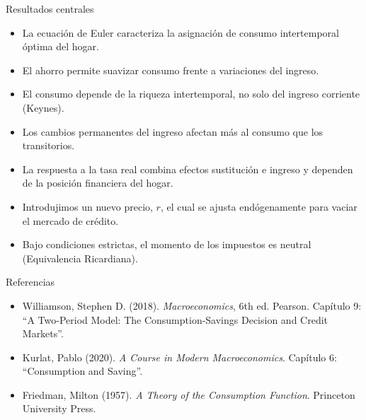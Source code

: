 \documentclass[aspectratio=169,11pt]{beamer}
\begin{document}
\begin{frame}{Resultados centrales}
  \begin{itemize}
    \setlength{\itemsep}{0.52em}
    \item La ecuación de Euler caracteriza la asignación de consumo intertemporal óptima del hogar.
    \item El ahorro permite suavizar consumo frente a variaciones del ingreso.
    \item El consumo depende de la riqueza intertemporal, no solo del ingreso corriente (Keynes).
    \item Los cambios permanentes del ingreso afectan más al consumo que los transitorios.
    \item La respuesta a la tasa real combina efectos sustitución e ingreso y dependen de la posición financiera del hogar.
    \item Introdujimos un nuevo precio, $r$, el cual se ajusta endógenamente para vaciar el mercado de crédito.
    \item Bajo condiciones estrictas, el momento de los impuestos es neutral (Equivalencia Ricardiana).
  \end{itemize}
\end{frame}

\begin{frame}{Referencias}
  \begin{itemize}
    \setlength{\itemsep}{0.8em}
    \item Williamson, Stephen D. (2018). \textit{Macroeconomics}, 6th ed. Pearson. Capítulo 9: ``A Two-Period Model: The Consumption-Savings Decision and Credit Markets''.
    \item Kurlat, Pablo (2020). \textit{A Course in Modern Macroeconomics}. Capítulo 6: ``Consumption and Saving''.
    \item Friedman, Milton (1957). \textit{A Theory of the Consumption Function}. Princeton University Press.
  \end{itemize}
\end{frame}





\appendix
\end{document}
